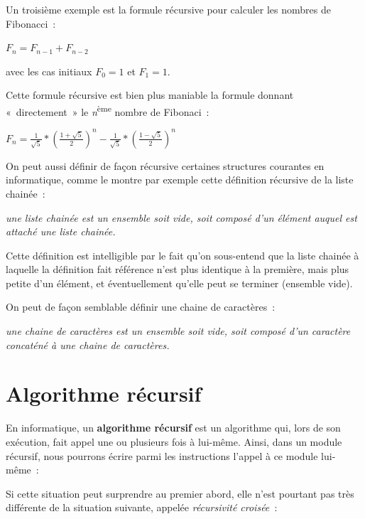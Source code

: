 	Un troisième exemple est la formule récursive pour 
	calculer les nombres de Fibonacci~:
	
	{\centering
	$F_n=F_{n-1}+F_{n-2}$
	\par}
	
	avec les cas initiaux $F_0 = 1$ et $F_1 = 1$. 
	
	Cette formule récursive est bien plus maniable la formule 
	donnant «~directement~» le \textit{n}\textsuperscript{ème} 
	nombre de Fibonaci~:
	
	{\centering
	$F_n=\frac{1}{\sqrt{5}} * (\frac{1+\sqrt{5}}{2})^n - \frac{1}{\sqrt{5}} * (\frac{1-\sqrt{5}}{2})^n $
	\par}

	On peut aussi définir de façon récursive certaines structures 
	courantes en informatique, comme le montre par
	exemple cette définition récursive de la liste chainée~:

	\textit{
	une liste chainée est un ensemble soit vide, 
	soit composé d'un élément auquel est attaché une liste chainée.}

	Cette définition est intelligible par le fait qu'on sous-entend 
	que la liste chainée à laquelle la définition fait
	référence n'est plus identique à la première, mais plus 
	petite d'un élément, et éventuellement qu'elle peut se terminer
	(ensemble vide).

	On peut de façon semblable définir une chaine de caractères~:

	\textit{une chaine de caractères est un ensemble soit vide, 
	soit composé d'un caractère concaténé à une chaine de caractères.}
	

\section{Algorithme récursif}

	En informatique, un \textbf{algorithme récursif} est 
	un algorithme qui, lors de son exécution, fait appel une ou
	plusieurs fois à lui-même. Ainsi, dans un module récursif, 
	nous pourrons écrire parmi les instructions l'appel à ce
	module lui-même~:


	Si cette situation peut surprendre au premier abord, elle 
	n'est pourtant pas très différente de la situation suivante,
	appelée \textit{récursivité croisée~}:

